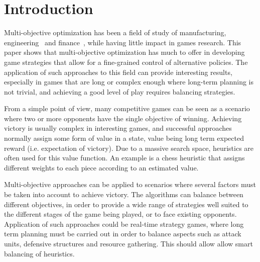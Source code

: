 \documentclass[journal]{IEEEtran}
\begin{document}
%
\IEEEpeerreviewmaketitle


%


\section{Introduction} \label{sec:intro}

Multi-objective optimization has been a field of study of manufacturing, engineering~\cite{Marler2004} and finance~\cite{Coello2006}, while having little impact in games research. This paper shows that multi-objective optimization has much to offer in developing game strategies that allow for a fine-grained control of alternative policies. The application of such approaches to this field can provide interesting results, especially in games that are long or complex enough where long-term planning is not trivial, and achieving a good level of play requires balancing strategies.

From a simple point of view, many competitive games can be seen as a scenario where two or more opponents have the single objective of winning. Achieving victory is usually complex in interesting games, and successful approaches normally assign some form of value in a state, value being long term expected reward (i.e. expectation of victory). Due to a massive search space, heuristics are often used for this value function. An example is a chess heuristic that assigns different weights to each piece according to an estimated value.

Multi-objective approaches can be applied to scenarios where several factors must be taken into account to achieve victory. The algorithms can balance between different objectives, in order to provide a wide range of strategies well suited to the different stages of the game being played, or to face existing opponents. Application of such approaches could be real-time strategy games, where long term planning must be carried out in order to balance aspects such as attack units, defensive structures and resource gathering. This should allow allow smart balancing of heuristics. 
\end{document}
